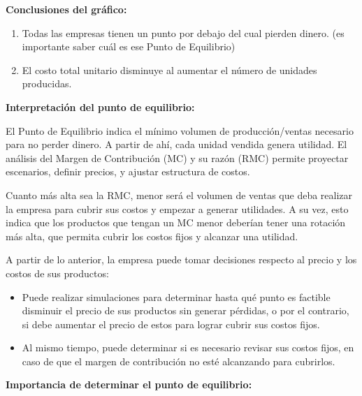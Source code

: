 \documentclass[a4paper,oneside,11pt]{article}
\begin{document}
\textbf{Conclusiones del gráfico:}

\begin{enumerate}
    \item  Todas las empresas tienen un punto por debajo del cual pierden dinero. (es importante saber cuál es ese Punto de Equilibrio)
    \item El costo total unitario disminuye al aumentar el número de unidades producidas.
\end{enumerate}

\textbf{Interpretación del punto de equilibrio:}

El Punto de Equilibrio indica el mínimo volumen de producción/ventas necesario para no perder dinero. A partir de ahí, cada unidad vendida genera utilidad. El análisis del Margen de Contribución (MC) y su razón (RMC) permite proyectar escenarios, definir precios, y ajustar estructura de costos.

Cuanto más alta sea la RMC, menor será el volumen de ventas que deba realizar la empresa para cubrir sus costos y empezar a generar utilidades. A su vez, esto indica que los productos que tengan un MC menor deberían tener una rotación más alta, que permita cubrir los costos fijos y alcanzar una utilidad.

A partir de lo anterior, la empresa puede tomar decisiones respecto al precio y los costos de sus productos: 
\begin{itemize}
    \item Puede realizar simulaciones para determinar hasta qué punto es factible disminuir el precio de sus productos sin generar pérdidas, o por el contrario, si debe aumentar el precio de estos para lograr cubrir sus costos fijos.
    \item Al mismo tiempo, puede determinar si es necesario revisar sus costos fijos, en caso de que el margen de contribución no esté alcanzando para cubrirlos.
\end{itemize}

\textbf{Importancia de determinar el punto de equilibrio:}
\end{document}
